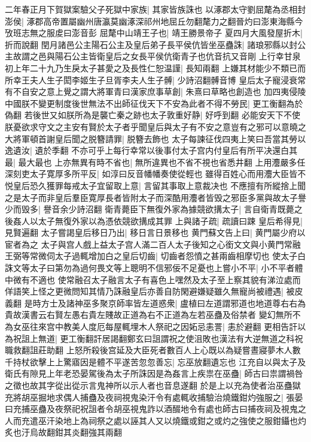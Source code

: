 二年春正月下賀獄案驗父子死獄中家族|{
	其家皆族誅也}
以涿郡太守劉屈氂為丞相封澎侯|{
	涿郡高帝置屬幽州唐瀛莫幽涿深祁州地屈丘勿翻氂力之翻晉灼曰澎東海縣今攷班志無之服䖍曰澎音彭}
屈氂中山靖王子也|{
	靖王勝景帝子}
夏四月大風發屋折木|{
	折而說翻}
閏月諸邑公主陽石公主及皇后弟子長平侯伉皆坐巫蠱誅|{
	諸琅邪縣以封公主故謂之邑與陽石公主皆衛皇后之女長平侯伉衛青子也伉音抗又音剛}
上行幸甘泉　初上年二十九乃生戾太子甚愛之及長性仁恕温謹|{
	長知兩翻}
上嫌其材能少不類已而所幸王夫人生子閎李姬生子旦胥李夫人生子髆|{
	少詩沼翻髆音博}
皇后太子寵浸衰常有不自安之意上覺之謂大將軍青曰漢家庶事草創|{
	朱熹曰草略也創造也}
加四夷侵陵中國朕不變更制度後世無法不出師征伐天下不安為此者不得不勞民|{
	更工衡翻為於偽翻}
若後世又如朕所為是襲亡秦之跡也太子敦重好静|{
	好呼到翻}
必能安天下不使朕憂欲求守文之主安有賢於太子者乎聞皇后與太子有不安之意豈有之邪可以意曉之大將軍頓首謝皇后聞之脱簪請罪|{
	脱簪去飾也}
太子每諫征伐四夷上笑曰吾當其勞以逸遺汝|{
	遺於季翻}
不亦可乎上每行幸常以後事付太子宫内付皇后有所平决還白其最|{
	最大最也}
上亦無異有時不省也|{
	無所違異也不省不視也省悉井翻}
上用灋嚴多任深刻吏太子寛厚多所平反|{
	如淳曰反音幡幡奏使從輕也}
雖得百姓心而用灋大臣皆不悦皇后恐久獲罪每戒太子宜留取上意|{
	言留其事取上意裁决也}
不應擅有所縱捨上聞之是太子而非皇后羣臣寛厚長者皆附太子而深酷用灋者皆毁之邪臣多黨與故太子譽少而毁多|{
	譽音余少詩沼翻}
衛青薨臣下無復外家為據競欲搆太子|{
	言自衛青既薨之後姦人以太子無復外家以為憑依競欲搆成其罪}
上與諸子疏|{
	疏讀曰踈}
皇后希得見|{
	見賢遍翻}
太子嘗謁皇后移日乃出|{
	移日言日景移也}
黄門蘇文告上曰|{
	黄門屬少府以宦者為之}
太子與宫人戲上益太子宫人滿二百人太子後知之心銜文文與小黄門常融王弼等常微伺太子過輒增加白之皇后切齒|{
	切齒者怨憤之甚兩齒相摩切也}
使太子白誅文等太子曰第勿為過何畏文等上聰明不信邪佞不足憂也上嘗小不平|{
	小不平者體中微有不適也}
使常融召太子融言太子有喜色上嘿然及太子至上察其貌有涕泣處而佯語笑上怪之更微問知其情乃誅融皇后亦善自防閑避嫌疑雖久無寵尚被禮遇|{
	被皮義翻}
是時方士及諸神巫多聚京師率皆左道惑衆|{
	盧植曰左道謂邪道也地道尊右右為貴故漢書云右賢左愚右貴左賤故正道為右不正道為左若巫蠱及俗禁者}
變幻無所不為女巫往來宫中教美人度厄每屋輒埋木人祭祀之因妬忌恚詈|{
	恚於避翻}
更相告訐以為祝詛上無道|{
	更工衡翻訐居謁翻鄭玄曰詛謂祝之使沮敗也漢法有大逆無道之科祝職救翻詛莊助翻}
上怒所殺後宫延及大臣死者數百人上心既以為疑嘗晝寢夢木人數千持杖欲擊上上驚寤因是體不平遂苦忽忽善忘|{
	忘巫放翻遺忘也}
江充自以與太子及衛氏有隙見上年老恐晏駕後為太子所誅因是為姦言上疾祟在巫蠱|{
	師古曰祟謂禍咎之徵也故其字從出從示言鬼神所以示人者也音息遂翻}
於是上以充為使者治巫蠱獄充將胡巫掘地求偶人捕蠱及夜祠視鬼染汗令有處輒收捕驗治燒鐵鉗灼強服之|{
	張晏曰充捕巫蠱及夜祭祀祝詛者令胡巫視鬼詐以酒醊地令有處也師古曰捕夜祠及視鬼之人而充遣巫汗染地上為祠祭之處以誣其人又以燒鐵或鉗之或灼之強使之服鉗鑷也灼炙也汙烏故翻鉗其炎翻強其兩翻}

